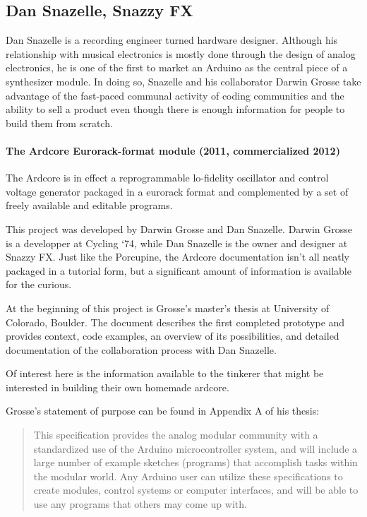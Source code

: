 \subsection{Dan Snazelle, Snazzy FX}

Dan Snazelle is a recording engineer turned hardware designer. Although his relationship with musical electronics is mostly done through the design of analog electronics, he is one of the first to market an Arduino as the central piece of a synthesizer module. In doing so, Snazelle and his collaborator Darwin Grosse take advantage of the fast-paced communal activity of coding communities and the ability to sell a product even though there is enough information for people to build them from scratch. 

\paragraph{The Ardcore Eurorack-format module (2011, commercialized 2012)}

The Ardcore is in effect a reprogrammable lo-fidelity oscillator and control voltage generator packaged in a eurorack format and complemented by a set of freely available and editable programs. 

This project was developed by Darwin Grosse and Dan Snazelle. Darwin Grosse is a developper at Cycling `74, while Dan Snazelle is the owner and designer at Snazzy FX. Just like the Porcupine, the Ardcore documentation isn't all neatly packaged in a tutorial form, but a significant amount of  information is available for the curious. 

At the beginning of this project is Grosse's master's thesis at University of Colorado, Boulder. The document describes the first completed prototype and provides context, code examples, an overview of its possibilities, and detailed documentation of the collaboration process with Dan Snazelle. 

Of interest here is the information available to the tinkerer that might be interested in building their own homemade ardcore. 

Grosse's statement of purpose can be found in Appendix A of his thesis: 

\begin{quote}

	This specification provides the analog modular community with a standardized use of the Arduino microcontroller system, and will include a large number of example sketches (programs) that accomplish tasks within the modular world. Any Arduino user can utilize these specifications to create modules, control systems or computer interfaces, and will be able to use any programs that others may come up with.
	
	\end{quote}
	
